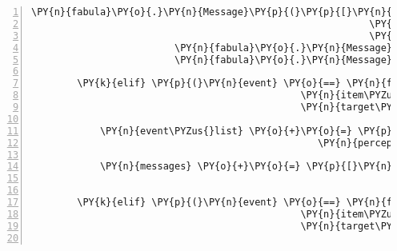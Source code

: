 \begin{Verbatim}[commandchars=\\\{\},numbers=left,firstnumber=1,stepnumber=1]
                         \PY{n}{fabula}\PY{o}{.}\PY{n}{Message}\PY{p}{(}\PY{p}{[}\PY{n}{fabula}\PY{o}{.}\PY{n}{DropsEvent}\PY{p}{(}\PY{n}{ID\PYZus{}CASSANDRA}\PY{p}{,}
                                                           \PY{n+nb+bp}{self}\PY{o}{.}\PY{n}{host}\PY{o}{.}\PY{n}{rack}\PY{o}{.}\PY{n}{entity\PYZus{}dict}\PY{p}{[}\PY{l+s}{\PYZsq{}}\PY{l+s}{key}\PY{l+s}{\PYZsq{}}\PY{p}{]}\PY{p}{,}
                                                           \PY{n}{room}\PY{o}{.}\PY{n}{entity\PYZus{}locations}\PY{p}{[}\PY{l+s}{\PYZsq{}}\PY{l+s}{door}\PY{l+s}{\PYZsq{}}\PY{p}{]}\PY{p}{)}\PY{p}{]}\PY{p}{)}\PY{p}{,}
                         \PY{n}{fabula}\PY{o}{.}\PY{n}{Message}\PY{p}{(}\PY{p}{[}\PY{n}{fabula}\PY{o}{.}\PY{n}{DeleteEvent}\PY{p}{(}\PY{n}{identifier}\PY{o}{=}\PY{l+s}{\PYZsq{}}\PY{l+s}{key}\PY{l+s}{\PYZsq{}}\PY{p}{)}\PY{p}{]}\PY{p}{)}\PY{p}{,}
                         \PY{n}{fabula}\PY{o}{.}\PY{n}{Message}\PY{p}{(}\PY{p}{[}\PY{n}{fabula}\PY{o}{.}\PY{n}{DeleteEvent}\PY{p}{(}\PY{n}{identifier}\PY{o}{=}\PY{l+s}{\PYZsq{}}\PY{l+s}{door}\PY{l+s}{\PYZsq{}}\PY{p}{)}\PY{p}{]}\PY{p}{)}\PY{p}{]}

        \PY{k}{elif} \PY{p}{(}\PY{n}{event} \PY{o}{==} \PY{n}{fabula}\PY{o}{.}\PY{n}{TriesToDropEvent}\PY{p}{(}\PY{n}{identifier}\PY{o}{=}\PY{n}{ID\PYZus{}CASSANDRA}\PY{p}{,}
                                               \PY{n}{item\PYZus{}identifier}\PY{o}{=}\PY{l+s}{\PYZsq{}}\PY{l+s}{key}\PY{l+s}{\PYZsq{}}\PY{p}{,}
                                               \PY{n}{target\PYZus{}identifier}\PY{o}{=}\PY{n}{ID\PYZus{}KUNI}\PY{p}{)}\PY{p}{)}\PY{p}{:}

            \PY{n}{event\PYZus{}list} \PY{o}{+}\PY{o}{=} \PY{p}{[}\PY{n}{fabula}\PY{o}{.}\PY{n}{PerceptionEvent}\PY{p}{(}\PY{n}{identifier}\PY{o}{=}\PY{n}{ID\PYZus{}CASSANDRA}\PY{p}{,}
                                                  \PY{n}{perception}\PY{o}{=}\PY{l+s}{\PYZsq{}}\PY{l+s}{Kuni hat den Schlüssel gesehen.}\PY{l+s}{\PYZsq{}}\PY{p}{)}\PY{p}{]}

            \PY{n}{messages} \PY{o}{+}\PY{o}{=} \PY{p}{[}\PY{n}{fabula}\PY{o}{.}\PY{n}{Message}\PY{p}{(}\PY{p}{[}\PY{n}{fabula}\PY{o}{.}\PY{n}{PerceptionEvent}\PY{p}{(}\PY{n}{identifier}\PY{o}{=}\PY{n}{ID\PYZus{}KUNI}\PY{p}{,}
                                                                \PY{n}{perception}\PY{o}{=}\PY{l+s}{\PYZsq{}}\PY{l+s}{Cassandra hat einen Schlüssel.}\PY{l+s}{\PYZsq{}}\PY{p}{)}\PY{p}{]}\PY{p}{)}\PY{p}{]}

        \PY{k}{elif} \PY{p}{(}\PY{n}{event} \PY{o}{==} \PY{n}{fabula}\PY{o}{.}\PY{n}{TriesToDropEvent}\PY{p}{(}\PY{n}{identifier}\PY{o}{=}\PY{n}{ID\PYZus{}CASSANDRA}\PY{p}{,}
                                               \PY{n}{item\PYZus{}identifier}\PY{o}{=}\PY{l+s}{\PYZsq{}}\PY{l+s}{key}\PY{l+s}{\PYZsq{}}\PY{p}{,}
                                               \PY{n}{target\PYZus{}identifier}\PY{o}{=}\PY{l+s}{\PYZsq{}}\PY{l+s}{spider}\PY{l+s}{\PYZsq{}}\PY{p}{)}\PY{p}{)}\PY{p}{:}


\end{Verbatim}
